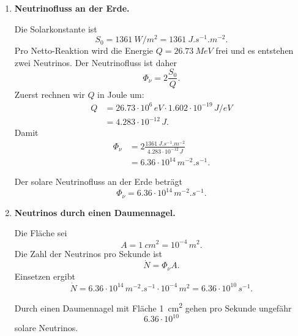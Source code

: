 \documentclass[11pt,a4paper]{scrartcl}
\theoremstyle{definition}
\theoremstyle{plain}
\theoremstyle{remark}
\begin{document}
\begin{enumerate}[label=(\alph*)]
    \item \textbf{Neutrinofluss an der Erde.}

    \begin{calculationbox}
        Die Solarkonstante ist
        \[
            S_0=\SI{1361}{W/m^2}=\SI{1361}{J.s^{-1}.m^{-2}}.
        \]
        Pro Netto-Reaktion wird die Energie $Q=\SI{26.73}{MeV}$ frei und es entstehen zwei Neutrinos. Der Neutrinofluss ist daher
        \[
            \Phi_\nu=2\frac{S_0}{Q}.
        \]
        Zuerst rechnen wir $Q$ in Joule um:
        \[
        \begin{aligned}
            Q
            &=26.73\cdot10^6\,\si{eV}\cdot1.602\cdot10^{-19}\,\si{J/eV}\\
            &=4.283\cdot10^{-12}\,\si{J}.
        \end{aligned}
        \]
        Damit
        \[
        \begin{aligned}
            \Phi_\nu
            &=2\frac{\SI{1361}{J.s^{-1}.m^{-2}}}{4.283\cdot10^{-12}\,\si{J}}\\
            &=6.36\cdot10^{14}\,\si{m^{-2}.s^{-1}}.
        \end{aligned}
        \]
    \end{calculationbox}

    \begin{answerbox}
        Der solare Neutrinofluss an der Erde beträgt
        \[
            \boxed{\Phi_\nu=6.36\cdot10^{14}\,\si{m^{-2}.s^{-1}}}.
        \]
    \end{answerbox}

    \item \textbf{Neutrinos durch einen Daumennagel.}

    \begin{calculationbox}
        Die Fläche sei
        \[
            A=\SI{1}{cm^2}=10^{-4}\,\si{m^2}.
        \]
        Die Zahl der Neutrinos pro Sekunde ist
        \[
            \dot N=\Phi_\nu A.
        \]
        Einsetzen ergibt
        \[
            \dot N
            =6.36\cdot10^{14}\,\si{m^{-2}.s^{-1}}\cdot10^{-4}\,\si{m^2}
            =6.36\cdot10^{10}\,\si{s^{-1}}.
        \]
    \end{calculationbox}

    \begin{answerbox}
        Durch einen Daumennagel mit Fläche \SI{1}{cm^2} gehen pro Sekunde ungefähr
        \[
            \boxed{6.36\cdot10^{10}}
        \]
        solare Neutrinos.
    \end{answerbox}


\end{enumerate}
\end{document}
